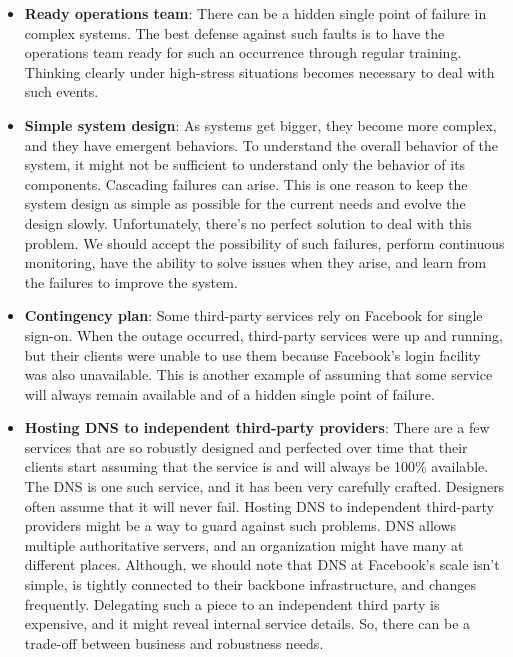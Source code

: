 \begin{itemize}
\item
\protect{}\label{N0Xbo3Zjw4AIm7UdBdOS-}
\textbf{Ready operations team}: There can be a hidden single point of failure in complex systems. The best defense against such faults is to have the operations team ready for such an occurrence through regular training. Thinking clearly under high-stress situations becomes necessary to deal with such events.
\item
\protect{}\label{a78AgaNaGzGfwglqNlAt0}
\textbf{Simple system design}: As systems get bigger, they become more complex, and they have emergent behaviors. To understand the overall behavior of the system, it might not be sufficient to understand only the behavior of its components. Cascading failures can arise. This is one reason to keep the system design as simple as possible for the current needs and evolve the design slowly. Unfortunately, there's no perfect solution to deal with this problem. We should accept the possibility of such failures, perform continuous monitoring, have the ability to solve issues when they arise, and learn from the failures to improve the system.
\item
\protect{}\label{-duQM95LuU2dSWLsVVnhm}
\textbf{Contingency plan}: Some third-party services rely on Facebook for single sign-on. When the outage occurred, third-party services were up and running, but their clients were unable to use them because Facebook's login facility was also unavailable. This is another example of assuming that some service will always remain available and of a hidden single point of failure.
\item
\protect{}\label{4_4WIAOf4d0pf9M9RZz50}
\textbf{Hosting DNS to independent third-party providers}: There are a few services that are so robustly designed and perfected over time that their clients start assuming that the service is and will always be 100\% available. The DNS is one such service, and it has been very carefully crafted. Designers often assume that it will never fail. Hosting DNS to independent third-party providers might be a way to guard against such problems. DNS allows multiple authoritative servers, and an organization might have many at different places. Although, we should note that DNS at Facebook's scale isn't simple, is tightly connected to their backbone infrastructure, and changes frequently. Delegating such a piece to an independent third party is expensive, and it might reveal internal service details. So, there can be a trade-off between business and robustness needs.

\end{itemize}
